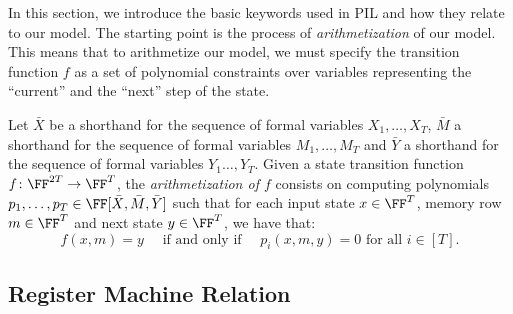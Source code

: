 In this section, we introduce the basic keywords used in PIL and how they relate to our model. The starting point is the process of \textit{arithmetization} of our model. This means that to arithmetize our model, we must specify the transition function $f$ as a set of polynomial constraints over variables representing the \enquote{current} and the \enquote{next} step of the state.

\begin{definition}[Arithmetization]
    Let $\bar{X}$ be a shorthand for the sequence of formal variables $X_1,\dots, X_T$, $\bar{M}$ a shorthand for the sequence of formal variables $M_1,\dots, M_T$ and $\bar{Y}$ a shorthand for the sequence of formal variables $Y_1\dots, Y_T$. Given a state transition function $f \colon \FF^{2T} \to \FF^T$, the \textit{arithmetization of $f$} consists on computing polynomials $p_1,\dots,p_T \in \FF[\bar{X},\bar{M},\bar{Y}]$ such that for each input state $x \in \FF^{T}$, memory row $m \in \FF^T$ and next state $y \in \FF^T$, we have that:
    \[
    f(x,m) = y \quad \text{ if and only if } \quad p_i(x,m,y) = 0 \text{ for all } i \in [T].	
    \]
\end{definition}


        




\subsection{Register Machine Relation}



